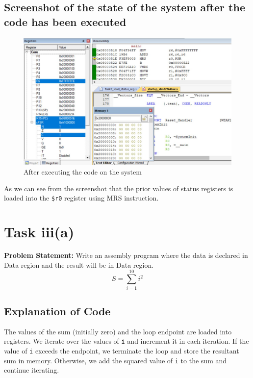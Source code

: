 \documentclass[footheight=20pt, footsepline, headheight=20pt, headsepline]{scrartcl}
\begin{document}
\subsection*{Screenshot of the state of the system after the code has been executed}
\begin{figure}[h!]
    \centering
    \includegraphics[scale=.7]{images/Task2_After1.jpg}
    \caption{After executing the code on the system}
    \label{fig:after_task_3a}
\end{figure}
\FloatBarrier
As we can see from the screenshot that the prior values of status registers is loaded into the \verb|$r0| register using MRS instruction.


\newpage
\FloatBarrier
\section*{Task iii(a)}
\textbf{Problem Statement:} Write an assembly program where the data is declared in Data region and the result will be in Data region.
\[ S = \sum_{i=1}^{10} i^{2} \]
\subsection*{Explanation of Code}
The values of the sum (initially zero) and the loop endpoint are loaded into registers. We iterate over the values of \verb|i| and increment it in each iteration. If the value of \verb|i| exceeds the endpoint, we terminate the loop and store the resultant sum in memory. Otherwise, we add the squared value of \verb|i| to the sum and continue iterating.
\end{document}
